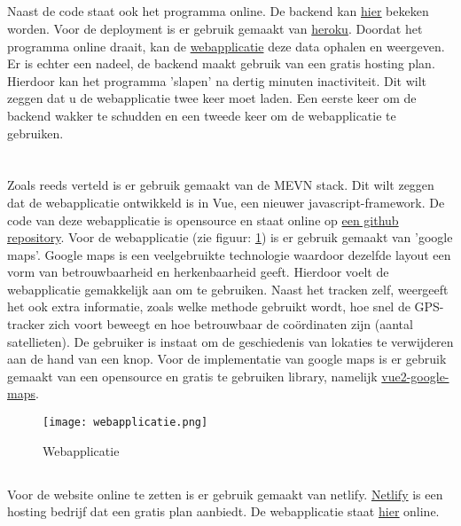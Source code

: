 \subsection{}
Naast de code staat ook het programma online. De backend kan \href{https://indy-bap-backend.herokuapp.com/api/locations}{\underline{hier}} bekeken worden. Voor de deployment is er gebruik gemaakt van \href{www.heroku.com}{heroku}. Doordat het programma online draait, kan de \href{https://indy-bap-frontend.netlify.com/}{webapplicatie} deze data ophalen en weergeven.
\newline
Er is echter een nadeel, de backend maakt gebruik van een gratis hosting plan. Hierdoor kan het programma 'slapen' na dertig minuten inactiviteit. Dit wilt zeggen dat u de webapplicatie twee keer moet laden. Een eerste keer om de backend wakker te schudden en een tweede keer om de webapplicatie te gebruiken.
\pagebreak
\section{}
\label{ch:frontend}

\subsection{}
Zoals reeds verteld is er gebruik gemaakt van de MEVN stack. Dit wilt zeggen dat de webapplicatie ontwikkeld is in Vue, een nieuwer javascript-framework. De code van deze webapplicatie is opensource en staat online op \href{https://github.com/IndyVC/bap-frontend}{een github repository}.
\newline
Voor de webapplicatie (zie figuur: \ref{fig:webapplicatie}) is er gebruik gemaakt van 'google maps'. Google maps is een veelgebruikte technologie waardoor dezelfde layout een vorm van betrouwbaarheid en herkenbaarheid geeft. Hierdoor voelt de webapplicatie gemakkelijk aan om te gebruiken. Naast het tracken zelf, weergeeft het ook extra informatie, zoals welke methode gebruikt wordt, hoe snel de GPS-tracker zich voort beweegt en hoe betrouwbaar de coördinaten zijn (aantal satellieten). De gebruiker is instaat om de geschiedenis van lokaties te verwijderen aan de hand van een knop.
\newline
Voor de implementatie van google maps is er gebruik gemaakt van een opensource en gratis te gebruiken library, namelijk \href{https://www.npmjs.com/package/vue2-google-maps}{vue2-google-maps}.
\begin{figure}
	\texttt{[image: webapplicatie.png]}
	\caption{Webapplicatie}
	\label{fig:webapplicatie}
\end{figure}

\subsection{}
Voor de website online te zetten is er gebruik gemaakt van netlify. \href{https://www.netlify.com/}{Netlify} is een hosting bedrijf dat een gratis plan aanbiedt. De webapplicatie staat \href{https://indy-bap-frontend.netlify.com/}{\underline{hier}} online.